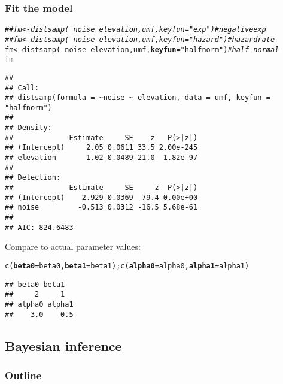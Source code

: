 \documentclass[color=usenames,dvipsnames]{beamer}\usepackage[]{graphicx}\usepackage[]{xcolor}
\makeatletter
\newcommand{\hlstr}[1]{\textcolor[rgb]{0.749,0.012,0.012}{#1}}%
\newcommand{\hlcom}[1]{\textcolor[rgb]{0.514,0.506,0.514}{\textit{#1}}}%
\newcommand{\hlopt}[1]{\textcolor[rgb]{0,0,0}{#1}}%
\newcommand{\hlstd}[1]{\textcolor[rgb]{0,0,0}{#1}}%
\newcommand{\hlkwb}[1]{\textcolor[rgb]{0,0.341,0.682}{#1}}%
\newcommand{\hlkwc}[1]{\textcolor[rgb]{0,0,0}{\textbf{#1}}}%
\newcommand{\hlkwd}[1]{\textcolor[rgb]{0.004,0.004,0.506}{#1}}%
\newenvironment{kframe}{%
 \def\at@end@of@kframe{}%
 \ifinner\ifhmode%
  \def\at@end@of@kframe{\end{minipage}}%
  \begin{minipage}{\columnwidth}%
 \fi\fi%
 \def\FrameCommand##1{\hskip\@totalleftmargin \hskip-\fboxsep
 \colorbox{shadecolor}{##1}\hskip-\fboxsep
     \hskip-\linewidth \hskip-\@totalleftmargin \hskip\columnwidth}%
 \MakeFramed {\advance\hsize-\width
   \@totalleftmargin\z@ \linewidth\hsize
   \@setminipage}}%
 {\par\unskip\endMakeFramed%
 \at@end@of@kframe}
\newenvironment{knitrout}{}{} %
\makeatother
\begin{document}
\begin{frame}[fragile]
  \frametitle{Fit the model}
  \footnotesize
\begin{knitrout}\tiny
{}\color{fgcolor}\begin{kframe}
\begin{alltt}
\hlcom{## fm <- distsamp(~noise ~elevation, umf, keyfun="exp")     # negative exp}
\hlcom{## fm <- distsamp(~noise ~elevation, umf, keyfun="hazard")  # hazard rate}
\hlstd{fm} \hlkwb{<-} \hlkwd{distsamp}\hlstd{(}\hlopt{~}\hlstd{noise} \hlopt{~}\hlstd{elevation, umf,} \hlkwc{keyfun}\hlstd{=}\hlstr{"halfnorm"}\hlstd{)}   \hlcom{# half-normal}
\hlstd{fm}
\end{alltt}
\begin{verbatim}
## 
## Call:
## distsamp(formula = ~noise ~ elevation, data = umf, keyfun = "halfnorm")
## 
## Density:
##             Estimate     SE    z   P(>|z|)
## (Intercept)     2.05 0.0611 33.5 2.00e-245
## elevation       1.02 0.0489 21.0  1.82e-97
## 
## Detection:
##             Estimate     SE     z  P(>|z|)
## (Intercept)    2.929 0.0369  79.4 0.00e+00
## noise         -0.513 0.0312 -16.5 5.68e-61
## 
## AIC: 824.6483
\end{verbatim}
\end{kframe}
\end{knitrout}
\pause
\vfill
Compare to actual parameter values:
\vspace{-6pt}
\begin{knitrout}\tiny
{}\color{fgcolor}\begin{kframe}
\begin{alltt}
\hlkwd{c}\hlstd{(}\hlkwc{beta0}\hlstd{=beta0,} \hlkwc{beta1}\hlstd{=beta1);} \hlkwd{c}\hlstd{(}\hlkwc{alpha0}\hlstd{=alpha0,} \hlkwc{alpha1}\hlstd{=alpha1)}
\end{alltt}
\begin{verbatim}
## beta0 beta1 
##     2     1
## alpha0 alpha1 
##    3.0   -0.5
\end{verbatim}
\end{kframe}
\end{knitrout}
\end{frame}




\subsection{Bayesian inference}


\begin{frame}
  \frametitle{Outline}
  \Large
\end{frame}
\end{document}
